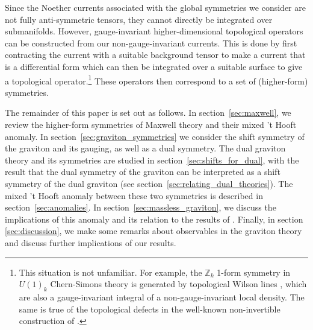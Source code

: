 Since the Noether currents associated with the global symmetries we consider are not fully anti-symmetric tensors, they cannot directly be integrated over submanifolds. However, gauge-invariant higher-dimensional topological operators
can be constructed from our non-gauge-invariant currents. This is done
by first contracting the current with a suitable background tensor
to make a current that is a differential form which can then be integrated over a suitable surface to give a topological operator.\footnote{This situation is not unfamiliar. For example, the $\mathbb{Z}_k$ 1-form symmetry in $U(1)_k$ Chern-Simons theory is generated by topological Wilson lines \cite{Gaiotto2015GeneralizedSymmetries}, which are also a gauge-invariant integral of a non-gauge-invariant local density. The same is true of the topological defects in the well-known non-invertible construction of \cite{Choi:2022jqy}.}
These operators then correspond to a set of (higher-form) symmetries.

The remainder of this paper is set out as follows. In section~\ref{sec:maxwell}, we review the higher-form symmetries of Maxwell theory and their mixed 't Hooft anomaly. 
In section~\ref{sec:graviton_symmetries} we consider the shift symmetry of the graviton and its gauging, as well as a dual symmetry.
The dual graviton theory and its symmetries are studied in section~\ref{sec:shifts_for_dual}, with the result that the dual symmetry of the graviton can be interpreted as a shift symmetry of the dual graviton (see section~\ref{sec:relating_dual_theories}).
The mixed 't Hooft anomaly between these two symmetries is described in section~\ref{sec:anomalies}. In section~\ref{sec:massless_graviton}, we discuss the implications of  this anomaly and its relation to the results of \cite{Hinterbichler2023GravitySymmetries}.
Finally, in section \ref{sec:discussion}, we make some remarks about observables in the graviton theory and discuss further implications of our results.



